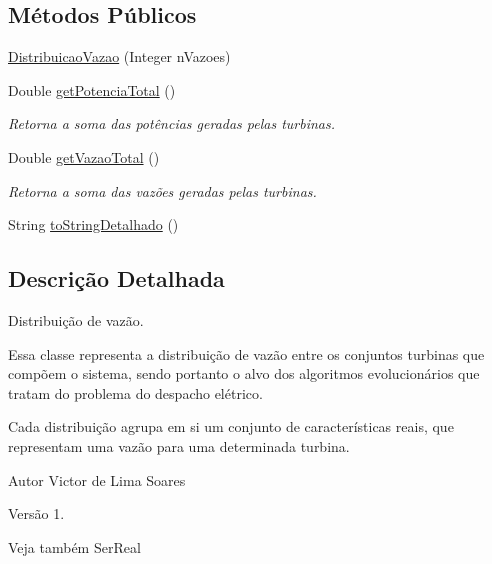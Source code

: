 \subsection*{Métodos Públicos}
\begin{DoxyCompactItemize}
\item 
\hyperlink{classusina_1_1_distribuicao_vazao_ac0e92594534527991f4f00240732e6a5}{Distribuicao\-Vazao} (Integer n\-Vazoes)
\item 
Double \hyperlink{classusina_1_1_distribuicao_vazao_afe121af5937973e50d18126a60293771}{get\-Potencia\-Total} ()
\begin{DoxyCompactList}\small\item\em Retorna a soma das potências geradas pelas turbinas. \end{DoxyCompactList}\item 
Double \hyperlink{classusina_1_1_distribuicao_vazao_ad34a5a0175ac8ed7c2fffc57b2fb325e}{get\-Vazao\-Total} ()
\begin{DoxyCompactList}\small\item\em Retorna a soma das vazões geradas pelas turbinas. \end{DoxyCompactList}\item 
String \hyperlink{classusina_1_1_distribuicao_vazao_a3fe3a91243c236757535a001afaf2aa3}{to\-String\-Detalhado} ()
\end{DoxyCompactItemize}


\subsection{Descrição Detalhada}
Distribuição de vazão. 

Essa classe representa a distribuição de vazão entre os conjuntos turbinas que compõem o sistema, sendo portanto o alvo dos algoritmos evolucionários que tratam do problema do despacho elétrico. 

Cada distribuição agrupa em si um conjunto de características reais, que representam uma vazão para uma determinada turbina. 

\begin{DoxyAuthor}{Autor}
Victor de Lima Soares
\end{DoxyAuthor}
\begin{DoxyVersion}{Versão}
1. 
\end{DoxyVersion}
\begin{DoxySeeAlso}{Veja também}
Ser\-Real 
\end{DoxySeeAlso}


